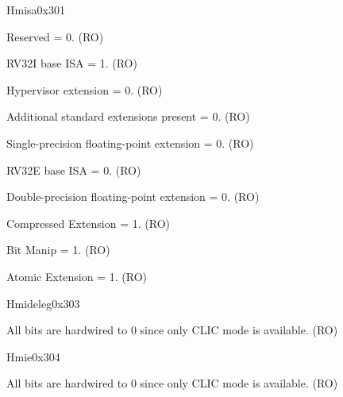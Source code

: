 \begin{register}{H}{misa}{0x301}
\begin{regdesc}
\begin{reglist}
\label{fielddesc:MISAJ}\item [J] Reserved = 0.  (RO)
\label{fielddesc:MISAI}\item [I] RV32I base ISA = 1. (RO)
\label{fielddesc:MISAH}\item [H] Hypervisor extension = 0. (RO)
\label{fielddesc:MISAG}\item [G] Additional standard extensions present = 0. (RO)
\label{fielddesc:MISAF}\item [F] Single-precision floating-point extension = 0. (RO)
\label{fielddesc:MISAE}\item [E] RV32E base ISA = 0. (RO)
\label{fielddesc:MISAD}\item [D] Double-precision floating-point extension = 0. (RO)
\label{fielddesc:MISAC}\item [C] Compressed Extension = 1. (RO)
\label{fielddesc:MISAB}\item [B] Bit Manip = 1. (RO)
\label{fielddesc:MISAA}\item [A] Atomic Extension = 1. (RO)
\end{reglist}\end{regdesc}
\end{register}

\begin{register}{H}{mideleg}{0x303}\label{regdesc:MIDELEG_REG}
%
\regnewline%
\begin{regdesc}\begin{reglist}
\label{fielddesc:MIDELEG}\item [{mideleg}] All bits are hardwired to 0 since only CLIC mode is available. (RO)
\end{reglist}\end{regdesc}
\end{register}

\begin{register}{H}{mie}{0x304}\label{regdesc:MIE_REG}
%
\regnewline%
\begin{regdesc}\begin{reglist}
\label{fielddesc:MIE}\item [{mie}] All bits are hardwired to 0 since only CLIC mode is available. (RO)
\end{reglist}\end{regdesc}
\end{register}

